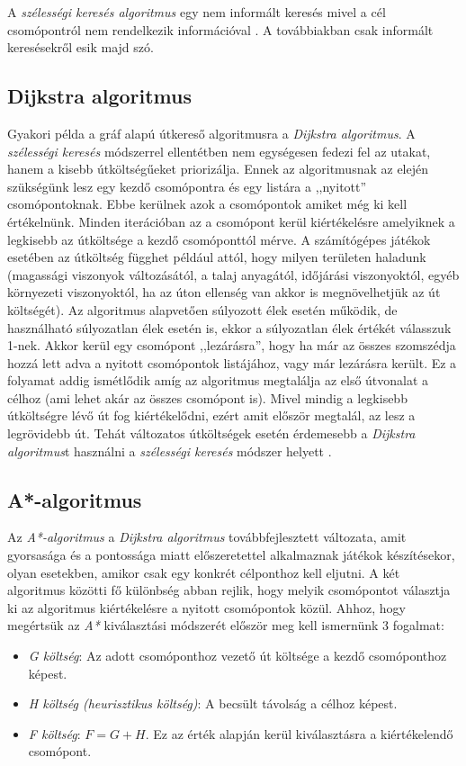 A \textit{szélességi keresés algoritmus} egy nem informált keresés mivel a cél csomópontról nem rendelkezik információval \cite{Breadth-first_search}. A továbbiakban csak informált keresésekről esik majd szó.

\subsection{Dijkstra algoritmus}

Gyakori példa a gráf alapú útkereső algoritmusra a \textit{Dijkstra algoritmus}. A \textit{szélességi keresés} módszerrel ellentétben nem egységesen fedezi fel az utakat, hanem a kisebb útköltségűeket priorizálja. Ennek az algoritmusnak az elején szükségünk lesz egy kezdő csomópontra és egy listára a ,,nyitott'' csomópontoknak. Ebbe kerülnek azok a csomópontok amiket még ki kell értékelnünk. Minden iterációban az a csomópont kerül kiértékelésre amelyiknek a legkisebb az útköltsége a kezdő csomóponttól mérve. A számítógépes játékok esetében az útköltség függhet például attól, hogy milyen területen haladunk (magassági viszonyok változásától, a talaj anyagától, időjárási viszonyoktól, egyéb környezeti viszonyoktól, ha az úton ellenség van akkor is megnövelhetjük az út költségét). Az algoritmus alapvetően súlyozott élek esetén működik, de használható súlyozatlan élek esetén is, ekkor a súlyozatlan élek értékét válasszuk 1-nek. Akkor kerül egy csomópont ,,lezárásra'', hogy ha már az összes szomszédja hozzá lett adva a nyitott csomópontok listájához, vagy már lezárásra került. Ez a folyamat addig ismétlődik amíg az algoritmus megtalálja az első útvonalat a célhoz (ami lehet akár az összes csomópont is). Mivel mindig a legkisebb útköltségre lévő út fog kiértékelődni, ezért amit először megtalál, az lesz a legrövidebb út. Tehát változatos útköltségek esetén érdemesebb a \textit{Dijkstra algoritmus}t használni a \textit{szélességi keresés} módszer helyett \cite{Dijkstra}.

\newpage
\subsection{A*-algoritmus}

Az \textit{A*-algoritmus} a \textit{Dijkstra algoritmus} továbbfejlesztett változata, amit gyorsasága és a pontossága miatt előszeretettel alkalmaznak játékok készítésekor, olyan esetekben, amikor csak egy konkrét célponthoz kell eljutni. A két algoritmus közötti fő különbség abban rejlik, hogy melyik csomópontot választja ki az algoritmus kiértékelésre a nyitott csomópontok közül. Ahhoz, hogy megértsük az \textit{A*} kiválasztási módszerét először meg kell ismernünk 3 fogalmat:
\begin{itemize}
\item \textit{G költség}: Az adott csomóponthoz vezető út költsége a kezdő csomóponthoz képest.
\item \textit{H költség (heurisztikus költség)}: A becsült távolság a célhoz képest.
\item \textit{F költség}: $F = G + H$. Ez az érték alapján kerül kiválasztásra a kiértékelendő csomópont.
\end{itemize}


